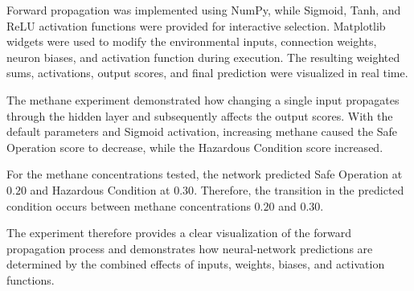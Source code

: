 \documentclass[12pt]{article}
\begin{document}
Forward propagation was implemented using NumPy, while Sigmoid, Tanh,
and ReLU activation functions were provided for interactive selection.
Matplotlib widgets were used to modify the environmental inputs,
connection weights, neuron biases, and activation function during
execution. The resulting weighted sums, activations, output scores,
and final prediction were visualized in real time.

The methane experiment demonstrated how changing a single input
propagates through the hidden layer and subsequently affects the
output scores. With the default parameters and Sigmoid activation,
increasing methane caused the Safe Operation score to decrease,
while the Hazardous Condition score increased.

For the methane concentrations tested, the network predicted Safe
Operation at $0.20$ and Hazardous Condition at $0.30$. Therefore,
the transition in the predicted condition occurs between methane
concentrations $0.20$ and $0.30$.

The experiment therefore provides a clear visualization of the forward
propagation process and demonstrates how neural-network predictions
are determined by the combined effects of inputs, weights, biases, and
activation functions.
\end{document}
